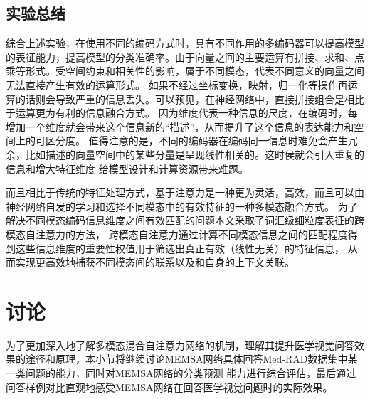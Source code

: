 \subsection{实验总结}
综合上述实验，在使用不同的编码方式时，具有不同作用的多编码器可以提高模型的表征能力，提高模型的分类准确率。由于向量之间的主要运算有拼接、求和、点乘等形式。受空间约束和相关性的影响，属于不同模态，代表不同意义的向量之间无法直接产生有效的运算形式。
如果不经过坐标变换，映射，归一化等操作再运算的话则会导致严重的信息丢失。可以预见，在神经网络中，直接拼接组合是相比于运算更为有利的信息融合方式。
因为维度代表一种信息的尺度，在编码时，每增加一个维度就会带来这个信息新的“描述”，从而提升了这个信息的表达能力和空间上的可区分度。
值得注意的是，不同的编码器在编码同一信息时难免会产生冗余，比如描述的向量空间中的某些分量是呈现线性相关的。这时侯就会引入重复的信息和增大特征维度
给模型设计和计算资源带来难题。

而且相比于传统的特征处理方式，基于注意力是一种更为灵活，高效，而且可以由神经网络自发的学习和选择不同模态中的有效特征的一种多模态融合方式。
为了解决不同模态编码信息维度之间有效匹配的问题本文采取了词汇级细粒度表征的跨模态自注意力的方法，
跨模态自注意力通过计算不同模态信息之间的匹配程度得到这些信息维度的重要性权值用于筛选出真正有效（线性无关）的特征信息，
从而实现更高效地捕获不同模态间的联系以及和自身的上下文关联。

\section{讨论}
为了更加深入地了解多模态混合自注意力网络的机制，理解其提升医学视觉问答效果的途径和原理，本小节将继续讨论MEMSA网络具体回答Med-RAD数据集中某一类问题的能力，同时对MEMSA网络的分类预测
能力进行综合评估，最后通过问答样例对比直观地感受MEMSA网络在回答医学视觉问题时的实际效果。
